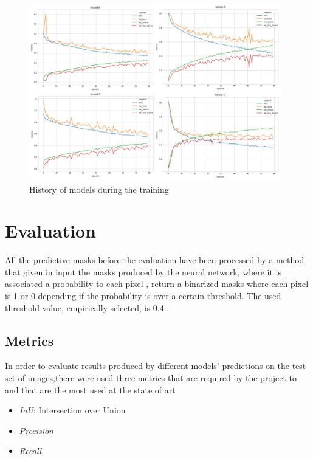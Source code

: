 \documentclass[a4paper,10pt]{report}
\begin{document}
\begin{figure}[h]
    \centering
    \includegraphics[width=0.98\textwidth]{assets/img/plots.png}
    \caption{History of models during the training}
    \label{fig:plot}
\end{figure}




\chapter{Evaluation}\label{chap:chapter-5}

All the predictive masks before the evaluation have been processed by a method that given in input the masks produced by the neural network, where it is associated a probability to each pixel , return a binarized masks where each pixel is 1 or 0 depending if the probability is over a certain threshold. The used threshold value, empirically selected, is 0.4 .

\section{Metrics}\label{sec:section-51}
In order to evaluate results produced by different models' predictions on the test set of images,there were used three metrics that are required by the project to and that are the most used at the state of art \cite{metrics}
\begin{itemize}
    \item \emph{IoU}: Intersection over Union
    \item \emph{Precision}
    \item \emph{Recall}
\end{itemize}
\end{document}
